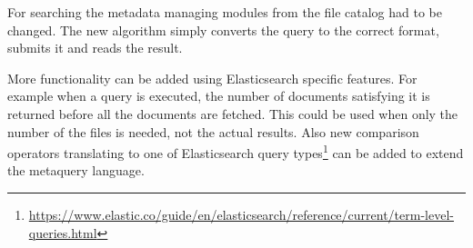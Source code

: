For searching the metadata managing modules from the file catalog had to be changed. The new algorithm simply 
converts the query to the correct format, submits it and reads the result.

More functionality can be added using Elasticsearch specific features. For example when a query is executed, the 
number of documents satisfying it is returned before all the documents are fetched. This could be used when only 
the number of the files is needed, not the actual results. Also new comparison operators translating to one of 
Elasticsearch query 
types\footnote{\url{https://www.elastic.co/guide/en/elasticsearch/reference/current/term-level-queries.html}} can be 
added to extend the metaquery language.